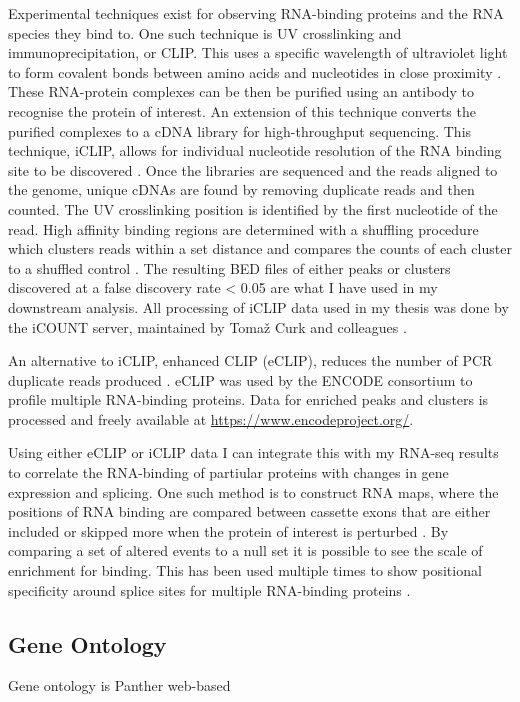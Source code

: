 Experimental techniques exist for observing RNA-binding proteins and the RNA species they bind to.
One such technique is UV crosslinking and immunoprecipitation, or CLIP. 
This uses a specific wavelength of ultraviolet light to form covalent bonds between amino acids and nucleotides in close proximity \citep{Ule2003}. 
These RNA-protein complexes can be then be purified using an antibody to recognise the protein of interest.
An extension of this technique converts the purified complexes to a cDNA library for high-throughput sequencing.
This technique, iCLIP, allows for individual nucleotide resolution of the RNA binding site to be discovered \citep{Konig2010,Huppertz2014-ip}.
Once the libraries are sequenced and the reads aligned to the genome, unique cDNAs are found by removing duplicate reads and then counted. 
The UV crosslinking position is identified by the first nucleotide of the read.
High affinity binding regions are determined with a shuffling procedure which clusters reads within a set distance and compares the counts of each cluster to a shuffled control \citep{Wang2010}.
The resulting BED files of either peaks or clusters discovered at a false discovery rate < 0.05 are what I have used in my downstream analysis.
All processing of iCLIP data used in my thesis was done by the iCOUNT server, maintained by Toma{\v{z}}  Curk and colleagues \citep{Curk2016}.

An alternative to iCLIP, enhanced CLIP (eCLIP), reduces the number of PCR duplicate reads produced  \citep{Van_Nostrand2016-su}. 
eCLIP was used by the ENCODE consortium to profile multiple RNA-binding proteins. 
Data for enriched peaks and clusters is processed and freely available at \url{https://www.encodeproject.org/}.

Using either eCLIP or iCLIP data I can integrate this with my RNA-seq results to correlate the RNA-binding of partiular proteins with changes in gene expression and splicing.
One such method is to construct RNA maps, where the positions of RNA binding are compared between cassette exons that are either included or skipped more when the protein of interest is perturbed \citep{Ule2006}. 
By comparing a set of altered events to a null set it is possible to see the scale of enrichment for binding. This has been used multiple times to show positional specificity around splice sites for multiple RNA-binding proteins \citep{Ule2006, Wang2010,Konig2010}.


\subsection{Gene Ontology}



Gene ontology is \citep{Ashburner2000,Carbon2017}
Panther  web-based  \citep{Thomas2003}



